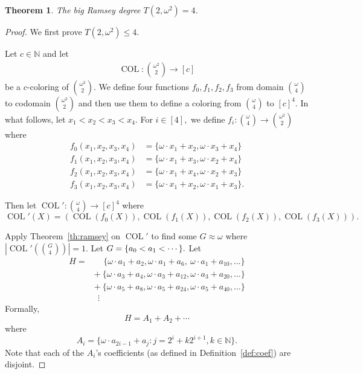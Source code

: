 \documentclass[11pt]{article}
\newcommand{\om}{\omega}
\newcommand{\oequiv}{\approx}
\newcommand{\setconcat}{+}
\newcommand{\COL}{\operatorname{COL}}
\newcommand{\N}{\mathbb{N}}
\newcommand{\numcolors}{c}
\newcommand{\commonconst}{a}
\newcommand{\Commonconst}{A}
\theoremstyle{plain}
\newtheorem{theorem}{Theorem}[section]
\theoremstyle{definition}
\begin{document}
\begin{theorem}\label{th:om2} 
The big Ramsey degree $T(2,\om^2)=4$.
\end{theorem} 
\begin{proof}
We first prove $T\left(2, \om^2\right) \leq 4$.

Let $\numcolors \in \N$ and let \begin{align*}
    \COL \colon \binom{\om^2}{2} \to [\numcolors]
\end{align*}
be a $\numcolors$-coloring of $\binom{\om^2}{2}$. 
We define four functions $f_0,f_1,f_2,f_3$ from 
domain $\binom{\om}{4}$ to codomain $\binom{\om^2}{2}$ and then use them to define a coloring 
from 
$\binom{\om}{4}$ to $[\numcolors]^4$.
In what follows, 
let $x_1<x_2<x_3<x_4$. For $i \in [4],$ we define $f_i \colon \binom{\om}{4} \to \binom{\om^2}{2}$ where \begin{align*}
f_0(x_1,x_2,x_3,x_4)  &= \{\om \cdot x_1 + x_2, \om \cdot x_3 + x_4\}\\
f_1(x_1,x_2,x_3,x_4)  &= \{\om \cdot x_1 + x_3, \om \cdot x_2 + x_4\}\\
f_2(x_1,x_2,x_3,x_4)  &= \{\om \cdot x_1 + x_4, \om \cdot x_2 + x_3\}\\
f_3(x_1,x_2,x_3,x_4)  &= \{\om \cdot x_1 + x_2, \om \cdot x_1 + x_3\}.
\end{align*}

Then let
$\COL' \colon \binom{\om}{4} \to [\numcolors]^4$ where
$$\COL'(X) =(\COL(f_0(X)),
\COL(f_1(X)),
\COL(f_2(X)),
\COL(f_3(X))
).
$$

Apply Theorem~\ref{th:ramsey} on $\COL'$ to find some $G \oequiv \omega$ where 
$\left|\COL' \left( \binom{G}{4} \right)\right|=1$.
Let $G = \{\commonconst_0 <\nobreak \commonconst_1 <\nobreak \cdots\}.$ Let
\begin{align*}
H = & ~~~~\!~\{\om \cdot \commonconst_{1} + \commonconst_2, \om \cdot \commonconst_{1} + \commonconst_6,~\om \cdot \commonconst_{1} + \commonconst_{10}, \ldots\} \\
 & \setconcat ~\{\om \cdot \commonconst_{3} + \commonconst_{4}, \om \cdot \commonconst_{3} + \commonconst_{12}, \om \cdot \commonconst_{3} + \commonconst_{20}, \ldots\}\\
 & \setconcat~\{\om \cdot \commonconst_{5} + \commonconst_{8}, \om \cdot \commonconst_{5} + \commonconst_{24}, \om \cdot \commonconst_{5} + \commonconst_{40}, \ldots\}\\
& ~~\!\vdots
\end{align*}
Formally, $$
H = \Commonconst_1 \setconcat \Commonconst_2 \setconcat \cdots
$$ where $$
\Commonconst_i = \{\om\cdot \commonconst_{2i-1} + \commonconst_j \colon j = 2^i + k 2^{i+1}, k \in \N\}.
$$
Note that each of the $A_i$'s coefficients
(as defined in Definition~\ref{def:coef}) 
are disjoint.


\end{proof}
\end{document}

